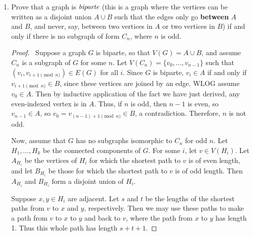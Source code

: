 \documentclass[12pt]{article}
\begin{document}
\begin{enumerate}[leftmargin=0cm,itemindent=.5cm,labelwidth=\itemindent,labelsep=0cm,align=left]
\begin{proof}
For the third tree, in the shape of a star, the directed trees where all directions point outwards or all directions point inwards are dependent only on the label of the center vertex.  So there are $5$ of each, thus these contribute 10.  For the star where the center vertex has outward degree of 2, there are $\dfrac{5!}{2^2} = 30$, because identical assignments are obtained by permuting the 2 outward legs and the 2 inward legs.  For the stars with outward degree 1 or 3, there are $\dfrac{5!}{3!} = 20$ labelings, since we may permute the labels of three legs which have the same direction.  So there are $2 \cdot 5 + 30 + 2 \cdot 20 = 80$ labeled directed trees of this form.

Thus there are $960 + 960 + 80 = 2000$ labeled directed trees on 5 vertices.

\end{proof}

\item Prove that a graph is $\emph{biparte}$ (this is a graph where the vertices can be written as a disjoint union $A\cup B$ such that the edges only go \textbf{between} $A$ and $B$, and never, say, between two vertices in $A$ or two vertices in $B$) if and only if there is no subgraph of form $C_n$, where $n$ is odd.

\begin{proof}

\ Suppose a graph $G$ is biparte, so that $V(G) = A \cup B$, and assume $C_n$ is a subgraph of $G$ for some $n$.  Let $V(C_n) = \{ v_0, \dots , v_{n-1} \}$ such that $(v_i, v_{i+1 \pmod{n}}) \in E(G)$ for all $i$.  Since $G$ is biparte, $v_i \in A$ if and only if $v_{i+1 \pmod{n}} \in B$, since these vertices are joined by an edge.  WLOG assume $v_0 \in A$.  Then by inductive application of the fact we have just derived, any even-indexed vertex is in $A$.  Thus, if $n$ is odd, then $n-1$ is even, so $v_{n-1} \in A$, so $v_0 = v_{(n-1) + 1 \pmod{n}} \in B$, a contradiction.  Therefore, $n$ is not odd.

Now, assume that $G$ has no subgraphs isomorphic to $C_n$ for odd $n$.  Let $H_1, \dots, H_k$ be the connected components of $G$.  For some $i$, let $v \in V(H_i)$.  Let $A_{H_i}$ be the vertices of $H_i$ for which the shortest path to $v$ is of even length, and let $B_{H_i}$ be those for which the shortest path to $v$ is of odd length.  Then $A_{H_i}$ and $B_{H_i}$ form a disjoint union of $H_i$.

Suppose $x,y \in H_i$ are adjacent.  Let $s$ and $t$ be the lengths of the shortest paths from $v$ to $x$ and $y$, respectively.  Then we may use these paths to make a path from $v$ to $x$ to $y$ and back to $v$, where the path from $x$ to $y$ has length 1.  Thus this whole path has length $s + t + 1$.


\end{proof}
\end{enumerate}
\end{document}
